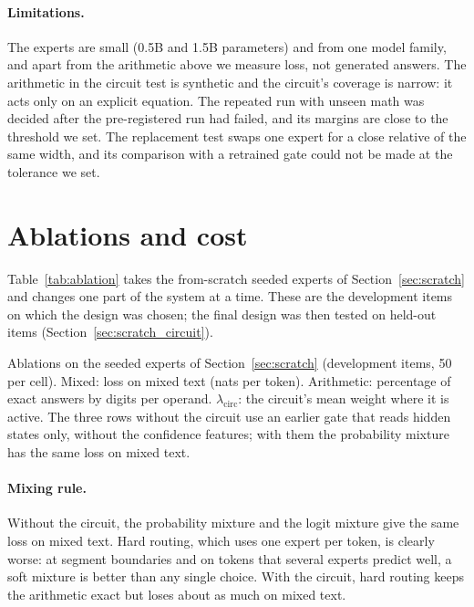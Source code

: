 \documentclass[10pt]{article}
\newcommand{\pending}[1]{{\color{red}\textbf{[#1]}}}
\begin{document}
\paragraph{Limitations.} The experts are small (0.5B and 1.5B parameters) and from one model
family, and apart from the arithmetic above we measure loss, not generated answers. The
arithmetic in the circuit test is synthetic and the circuit's coverage is narrow: it acts only
on an explicit equation. The repeated run with unseen math was decided after the
pre-registered run had failed, and its margins are close to the threshold we set. The
replacement test swaps one expert for a close relative of the same width, and its comparison
with a retrained gate could not be made at the tolerance we set.

\section{Ablations and cost}
\label{sec:ablations}

Table~\ref{tab:ablation} takes the from-scratch seeded experts of
Section~\ref{sec:scratch} and changes one part of the system at a time. These are the
development items on which the design was chosen; the final design was then tested on held-out
items (Section~\ref{sec:scratch_circuit}).
\begin{table}[t]
\centering\small
\caption{Ablations on the seeded experts of Section~\ref{sec:scratch} (development items, 50
per cell). Mixed: loss on mixed text (nats per token). Arithmetic: percentage of exact answers
by digits per operand. $\lambda_{\mathrm{circ}}$: the circuit's mean weight where it is active.
The three rows without the circuit use an earlier gate that reads hidden states only, without
the confidence features; with them the probability mixture has the same loss on mixed text.}
\label{tab:ablation}
{\footnotesize\setlength{\tabcolsep}{3pt}\IfFileExists{tables/track_c_ablation.tex}{}{\pending{table}}}
\end{table}

\paragraph{Mixing rule.} Without the circuit, the probability mixture and the logit mixture
give the same loss on mixed text. Hard routing, which uses one expert per token, is clearly
worse: at segment boundaries and on tokens that several experts predict well, a soft mixture
is better than any single choice. With the circuit, hard routing keeps the arithmetic exact but
loses about as much on mixed text.
\end{document}
